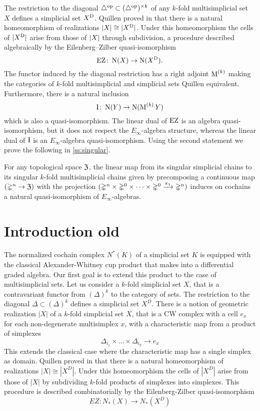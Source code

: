 The restriction to the diagonal $\triangle^{\mathrm{op}} \subset (\triangle^{\mathrm{op}})^{\times k}$ of any $k$-fold multisimplicial set $X$ defines a simplicial set $X^{\mathrm{D}}$.
Quillen proved in \cite{Quillen} that there is a natural homeomorphism of realizations $\lvert X\rvert \cong \lvert X^{\mathrm{D}}\rvert$.
Under this homeomorphism the cells of $\lvert X^{\mathrm{D}}\rvert$ arise from those of $\lvert X\rvert$ through subdivision, a procedure described algebraically by the Eilenberg--Zilber quasi-isomorphism
\[
\operatorname{EZ} \colon \operatorname{N}(X) \to \operatorname{N}(X^{\mathrm{D}}).
\]
The functor induced by the diagonal restriction has a right adjoint $\operatorname{M}^{(k)}$ making the categories of $k$-fold multisimplicial and simplicial sets Quillen equivalent.
Furthermore, there is a natural inclusion
\[
\operatorname{I} \colon \operatorname{N}(Y) \to \operatorname{N}(\operatorname{M}^{(k)} Y)
\]
which is also a quasi-isomorphism.
The linear dual of $\operatorname{EZ}$ is an algebra quasi-isomorphism, but it does not respect the $E_\infty$-algebra structure, whereas the linear dual of $\operatorname{I}$ is an $E_\infty$-algebra quasi-isomorphism.
Using the second statement we prove the following in \cref{ss:singular}.

\begin{corollary*}
	For any topological space $\mathfrak{Z}$, the linear map from its singular simplicial chains to its singular $k$-fold multisimplicial chains given by precomposing a continuous map $(\mathbb{\Delta}^n \to \mathfrak{Z})$ with the projection $(\mathbb{\Delta}^n \times \mathbb{\Delta}^{0}\times\dots\times\mathbb{\Delta}^{0} \xrightarrow{\pi_1} \mathbb{\Delta}^n)$ induces on cochains a natural quasi-isomorphism of $E_\infty$-algebras.
\end{corollary*}

\section{Introduction old}

The normalized cochain complex $N^*(K)$ of a simplicial set $K$ is equipped with the classical Alexander-Whitney cup product that makes into a differential graded algebra.
Our first goal is to extend this product to the case of multisimplicial sets.
Let us consider a $k$-fold simplicial set $X$, that is a contravariant functor from $(\Delta)^k$ to the category of sets.
The restriction to the diagonal $\Delta \subset (\Delta)^k$ defines a simplicial set $X^D$.
There is a notion of geometric realization $|X|$ of a $k$-fold simplicial set $X$, that is a CW complex with a cell $e_x$ for each non-degenerate multisimplex $x$, with a characteristic map from a product of simplexes $$\Delta_{i_1} \times \dots \times \Delta_{i_k} \to e_x$$ This extends the classical case where the characteristic map has a single simplex as domain.
Quillen proved in \cite{Quillen} that there is a natural homeomorphism of realizations $|X| \cong |X^D|$.
Under this homeomorphism the cells of $|X^D|$ arise from those of $|X|$ by subdividing $k$-fold products of simplexes into simplexes.
This procedure is described combinatorially by the Eilenberg-Zilber quasi-isomorphism
$$EZ:N_*(X) \to N_*(X^D)$$

